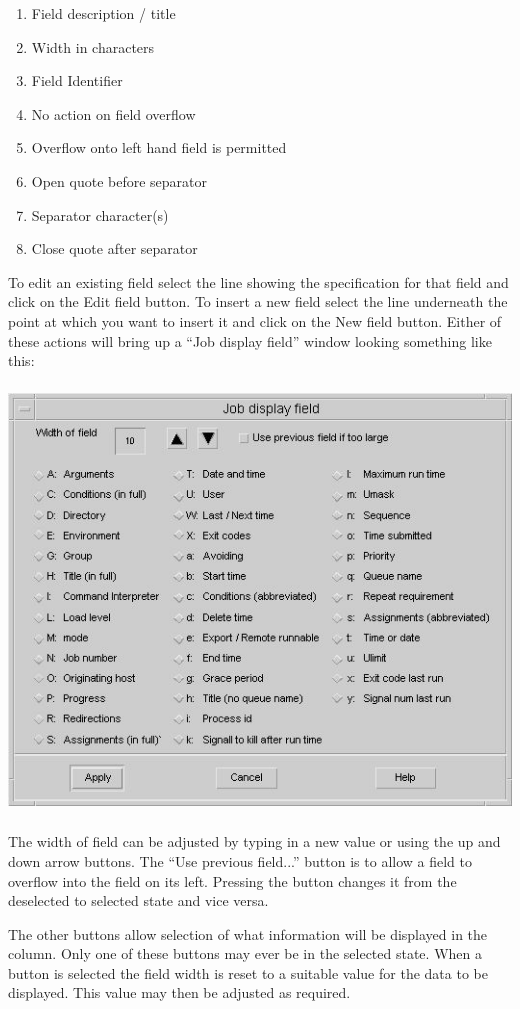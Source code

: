 \begin{enumerate}
\item Field description / title
\item Width in characters
\item Field Identifier
\item No action on field overflow
\item Overflow onto left hand field is permitted
\item Open quote before separator
\item Separator character(s)
\item Close quote after separator
\end{enumerate}
To edit an existing field select the line showing the specification for that field and click on the Edit field button. To insert a new field
select the line underneath the point at which you want to insert it and click on the New field button. Either of these actions will bring up a
``Job display field'' window looking something like this:

 \includegraphics[width=13.72cm,height=11.351cm]{img/ref34.jpg} 

The width of field can be adjusted by typing in a new value or using the up and down arrow buttons. The ``Use previous
field...'' button is to allow a field to overflow into the field on its left. Pressing the button changes it from the deselected
to selected state and vice versa.

The other buttons allow selection of what information will be displayed in the column. Only one of these buttons may ever be in the selected
state. When a button is selected the field width is reset to a suitable value for the data to be displayed. This value may then be adjusted as
required.

